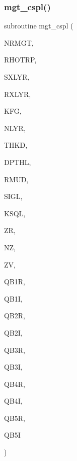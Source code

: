 \subsubsection{\texorpdfstring{mgt\+\_\+cspl()}{mgt\_cspl()}}
{\footnotesize\ttfamily subroutine mgt\+\_\+cspl (\begin{DoxyParamCaption}\item[{integer}]{N\+R\+M\+GT,  }\item[{real, dimension(nrmgt)}]{R\+H\+O\+T\+RP,  }\item[{integer}]{S\+X\+L\+YR,  }\item[{integer}]{R\+X\+L\+YR,  }\item[{integer}]{K\+FG,  }\item[{integer}]{N\+L\+YR,  }\item[{real (kind=ql), dimension(nlyr)}]{T\+H\+KD,  }\item[{real (kind=ql), dimension(nlyr)}]{D\+P\+T\+HL,  }\item[{real (kind=ql), dimension(0\+:nlyr)}]{R\+M\+UD,  }\item[{complex (kind=ql), dimension(nlyr)}]{S\+I\+GL,  }\item[{complex (kind=ql), dimension(nlyr)}]{K\+S\+QL,  }\item[{real (kind=ql)}]{ZR,  }\item[{integer}]{NZ,  }\item[{real, dimension(nz)}]{ZV,  }\item[{real, dimension (4,nrmgt,nz)}]{Q\+B1R,  }\item[{real, dimension (4,nrmgt,nz)}]{Q\+B1I,  }\item[{real, dimension (4,nrmgt,nz)}]{Q\+B2R,  }\item[{real, dimension (4,nrmgt,nz)}]{Q\+B2I,  }\item[{real, dimension (4,nrmgt,nz)}]{Q\+B3R,  }\item[{real, dimension (4,nrmgt,nz)}]{Q\+B3I,  }\item[{real, dimension (4,nrmgt,nz)}]{Q\+B4R,  }\item[{real, dimension (4,nrmgt,nz)}]{Q\+B4I,  }\item[{real, dimension (4,nrmgt,nz)}]{Q\+B5R,  }\item[{real, dimension (4,nrmgt,nz)}]{Q\+B5I }\end{DoxyParamCaption})}

